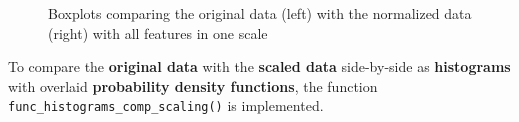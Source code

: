 \documentclass [oneside,10pt,a4paper,ngerman,BCOR10mm,headsepline,parindent,final]{scrartcl}
\begin{document}
    \begin{figure}
        \begin{center}\end{center}
        \caption{Boxplots comparing the original data (left) with the normalized data (right) with all features in one scale}
        \label{fig:boxplots_comp_orig_norm}
    \end{figure}
    
    To compare the \textbf{original data} with the \textbf{scaled data}
side-by-side as \textbf{histograms} with overlaid \textbf{probability
density functions}, the function
\texttt{func\_histograms\_comp\_scaling()} is implemented.
\end{document}
